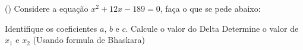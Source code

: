 \begin{question}[type=exam] () %
Considere a equação $x^2+12x-189=0$, faça o que se pede abaixo:
\begin{tasks}
        \task Identifique os coeficientes $a$, $b$ e $c$.
        \task Calcule o valor do Delta
        \task Determine o valor de $x_{1}$ e $x_{2}$ (Usando formula de Bhaskara)
    \end{tasks}
\end{question}